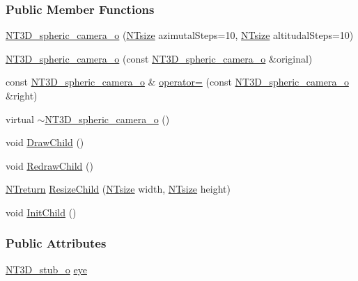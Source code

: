 \subsubsection*{Public Member Functions}
\begin{DoxyCompactItemize}
\item 
\hyperlink{class_n_t3_d__spheric__camera__o_aa01ee5624e3ee291d5b9f63036bf26a2}{NT3D\_\-spheric\_\-camera\_\-o} (\hyperlink{nt__types_8h_a06c124f2e4469769b58230253ce0560b}{NTsize} azimutalSteps=10, \hyperlink{nt__types_8h_a06c124f2e4469769b58230253ce0560b}{NTsize} altitudalSteps=10)
\item 
\hyperlink{class_n_t3_d__spheric__camera__o_a500f8d52b3b787d4a67af3134c65876b}{NT3D\_\-spheric\_\-camera\_\-o} (const \hyperlink{class_n_t3_d__spheric__camera__o}{NT3D\_\-spheric\_\-camera\_\-o} \&original)
\item 
const \hyperlink{class_n_t3_d__spheric__camera__o}{NT3D\_\-spheric\_\-camera\_\-o} \& \hyperlink{class_n_t3_d__spheric__camera__o_a08319bfd7b7111addd5ca2f740a92fa9}{operator=} (const \hyperlink{class_n_t3_d__spheric__camera__o}{NT3D\_\-spheric\_\-camera\_\-o} \&right)
\item 
virtual \hyperlink{class_n_t3_d__spheric__camera__o_abdd7ba35d0a3fba251a65dddcd0a5595}{$\sim$NT3D\_\-spheric\_\-camera\_\-o} ()
\item 
void \hyperlink{class_n_t3_d__spheric__camera__o_af21f849cd423ef0a7371ea9bf842cbdd}{DrawChild} ()
\item 
void \hyperlink{class_n_t3_d__spheric__camera__o_a55f6b350316b1b64e6e1c5e685c3e3d4}{RedrawChild} ()
\item 
\hyperlink{nt__types_8h_ab9564ee8f091e809d21b8451c6683c53}{NTreturn} \hyperlink{class_n_t3_d__spheric__camera__o_a9f1f2565b1ca1d4839fdaa1f35f223e8}{ResizeChild} (\hyperlink{nt__types_8h_a06c124f2e4469769b58230253ce0560b}{NTsize} width, \hyperlink{nt__types_8h_a06c124f2e4469769b58230253ce0560b}{NTsize} height)
\item 
void \hyperlink{class_n_t3_d__spheric__camera__o_a1ea6ee37f319cc46bb2af4d5e51cd792}{InitChild} ()
\end{DoxyCompactItemize}
\subsubsection*{Public Attributes}
\begin{DoxyCompactItemize}
\item 
\hyperlink{class_n_t3_d__stub__o}{NT3D\_\-stub\_\-o} \hyperlink{class_n_t3_d__spheric__camera__o_a3c1d3a9557c2c8bd668e906557355676}{eye}
\end{DoxyCompactItemize}


